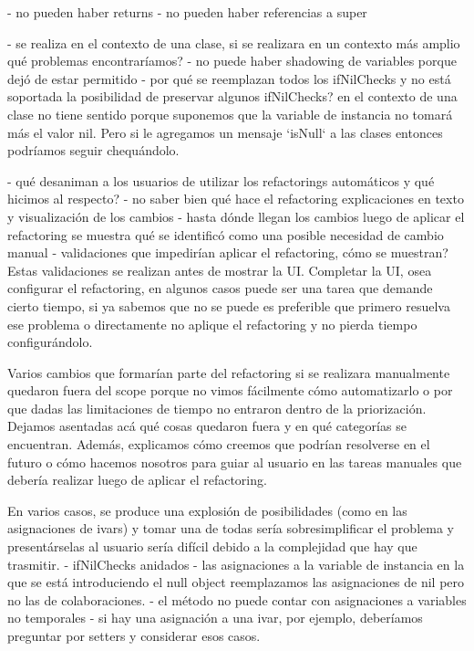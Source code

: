 - no pueden haber returns
- no pueden haber referencias a super

- se realiza en el contexto de una clase, si se realizara en un contexto más amplio qué problemas encontraríamos?
- no puede haber shadowing de variables porque dejó de estar permitido
- por qué se reemplazan todos los ifNilChecks y no está soportada la posibilidad de preservar algunos ifNilChecks? 
en el contexto de una clase no tiene sentido porque suponemos que la variable de instancia no
tomará más el valor nil. Pero si le agregamos un mensaje `isNull` a las clases entonces
podríamos seguir chequándolo. 


- qué desaniman a los usuarios de utilizar los refactorings automáticos y qué hicimos al respecto?
    - no saber bien qué hace el refactoring
    explicaciones en texto y visualización de los cambios
    - hasta dónde llegan los cambios
    luego de aplicar el refactoring se muestra qué se identificó como una posible necesidad de cambio manual
- validaciones que impedirían aplicar el refactoring, cómo se muestran? Estas validaciones se
realizan antes de mostrar la UI. Completar la UI, osea configurar el refactoring, en algunos
casos puede ser una tarea que demande cierto tiempo, si ya sabemos que no se puede es preferible
que primero resuelva ese problema o directamente no aplique el refactoring y no pierda tiempo
configurándolo.



Varios cambios que formarían parte del refactoring si se realizara manualmente quedaron fuera
del scope porque no vimos fácilmente cómo automatizarlo o por que dadas las limitaciones de
tiempo no entraron dentro de la priorización. Dejamos asentadas acá qué cosas quedaron fuera y
en qué categorías se encuentran. Además, explicamos cómo creemos que podrían resolverse en el
futuro o cómo hacemos nosotros para guiar al usuario en las tareas manuales que debería realizar
luego de aplicar el refactoring.

En varios casos, se produce una explosión de posibilidades (como en las asignaciones de ivars) y
tomar una de todas sería sobresimplificar el problema y presentárselas al usuario sería
difícil debido a la complejidad que hay que trasmitir.
- ifNilChecks anidados
- las asignaciones a la variable de instancia en la que se está introduciendo el null object
reemplazamos las asignaciones de nil pero no las de colaboraciones.
- el método no puede contar con asignaciones a variables no temporales
- si hay una asignación a una ivar, por ejemplo, deberíamos preguntar por setters y considerar esos
casos.

